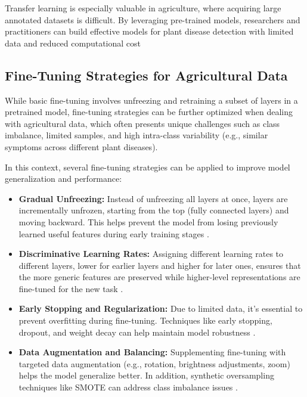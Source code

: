 Transfer learning is especially valuable in agriculture, where acquiring large annotated datasets is difficult. By leveraging pre-trained models, researchers and practitioners can build effective models for plant disease detection with limited data and reduced computational cost


\subsection{Fine-Tuning Strategies for Agricultural Data}


While basic fine-tuning involves unfreezing and retraining a subset of layers in a pretrained model, fine-tuning strategies can be further optimized when dealing with agricultural data, which often presents unique challenges such as class imbalance, limited samples, and high intra-class variability (e.g., similar symptoms across different plant diseases). 

In this context, several fine-tuning strategies can be applied to improve model generalization and performance:
\begin{itemize}
    \item \textbf{Gradual Unfreezing:} Instead of unfreezing all layers at once, layers are incrementally unfrozen, starting from the top (fully connected layers) and moving backward. This helps prevent the model from losing previously learned useful features during early training stages \parencite{hossen2025transfer}.
    \item \textbf{Discriminative Learning Rates:} Assigning different learning rates to different layers, lower for earlier layers and higher for later ones, ensures that the more generic features are preserved while higher-level representations are fine-tuned for the new task \parencite{hossen2025transfer}.
    \item \textbf{Early Stopping and Regularization:} Due to limited data, it's essential to prevent overfitting during fine-tuning. Techniques like early stopping, dropout, and weight decay can help maintain model robustness \parencite{li2021implicit}.
    \item \textbf{Data Augmentation and Balancing:} Supplementing fine-tuning with targeted data augmentation (e.g., rotation, brightness adjustments, zoom) helps the model generalize better. In addition, synthetic oversampling techniques like SMOTE can address class imbalance issues \parencite{aquino2017effect}.
\end{itemize}

